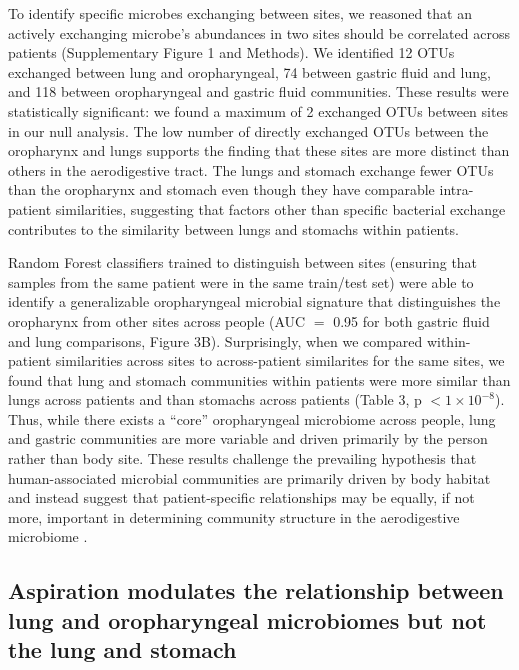 To identify specific microbes exchanging between sites, we reasoned that an actively exchanging microbe's abundances in two sites should be correlated across patients (Supplementary Figure 1 and Methods).
We identified 12 OTUs exchanged between lung and oropharyngeal, 74 between gastric fluid and lung, and 118 between oropharyngeal and gastric fluid communities.
These results were statistically significant: we found a maximum of 2 exchanged OTUs between sites in our null analysis.
The low number of directly exchanged OTUs between the oropharynx and lungs supports the finding that these sites are more distinct than others in the aerodigestive tract.
The lungs and stomach exchange fewer OTUs than the oropharynx and stomach even though they have comparable intra-patient similarities, suggesting that factors other than specific bacterial exchange contributes to the similarity between lungs and stomachs within patients.

Random Forest classifiers trained to distinguish between sites (ensuring that samples from the same patient were in the same train/test set) were able to identify a generalizable oropharyngeal microbial signature that distinguishes the oropharynx from other sites across people (AUC $=$ 0.95 for both gastric fluid and lung comparisons, Figure 3B).
Surprisingly, when we compared within-patient similarities across sites to across-patient similarites for the same sites, we found that lung and stomach communities within patients were more similar than lungs across patients and than stomachs across patients (Table 3, p $< 1 \times 10^{-8}$).
Thus, while there exists a ``core'' oropharyngeal microbiome across people, lung and gastric communities are more variable and driven primarily by the person rather than body site.
These results challenge the prevailing hypothesis that human-associated microbial communities are primarily driven by body habitat and instead suggest that patient-specific relationships may be equally, if not more, important in determining community structure in the aerodigestive microbiome \cite{costello2009bodysites,huttenhower2012hmp,lozupone2013bodysites}.

\FloatBarrier

\subsection{Aspiration modulates the relationship between lung and oropharyngeal microbiomes but not the lung and stomach}

